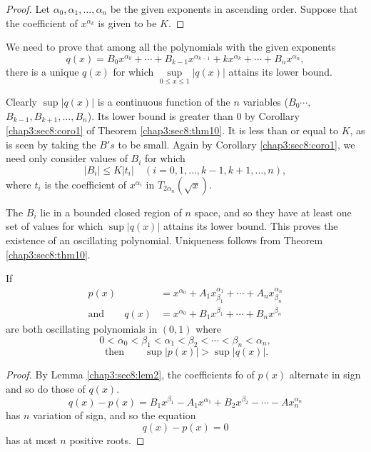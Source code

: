 \begin{proof}
  Let $\alpha _ 0, \alpha_1, \ldots, \alpha _n$ be the given exponents
  in ascending order. Suppose that the coefficient of $x^{\alpha_k}$
  is given to be $K$. 
\end{proof}

We need to prove that among all the polynomials with the given exponents
$$
q(x)=B_ 0 x^{\alpha _ 0}+ \cdots + B_{k-1}x^{\alpha_{k-1}}+k
x^{\alpha_k}+ \cdots + B_n x^{\alpha_n}, 
$$
there is a unique $q(x)$ for which $\sup \limits _{0 \leq x \leq 1}
|q(x)|$ attains its lower bound. 

Clearly $\sup |q(x)|$ is a continuous function of the $n$ variables
($B_ 0 \cdots,$ $B_{k-1},B_{k+1},\ldots, B_n$). Its lower bound is
greater than $0$ by Corollary \ref{chap3:sec8:coro1} of
Theorem \ref{chap3:sec8:thm10}. It is less than or
equal to $K$, as is seen by taking the $B's$ to be small. Again by
Corollary \ref{chap3:sec8:coro1}, we need only consider values of $B_i$ for which 
$$
|B_i|\leq K|t_i|\quad (i=0,1, \ldots, k-1,k+1,\ldots, n),
$$
where $t_i$ is the coefficient of $x^{\alpha_i}$ in $T_{2 \alpha_n}(\sqrt{x})$. 

The $B_i$ lie in a bounded closed region of $n$ space, and so they
have at least one set of values for which $\sup |q(x)|$ attains its
lower bound. This proves the existence of an oscillating
polynomial. Uniqueness follows from Theorem \ref{chap3:sec8:thm10}. 

\begin{theorem}\label{chap3:sec8:thm12}%
   If
   \begin{align*}
     p(x) & = x^{\alpha _ 0}+A_1x^{\alpha_1}_{\beta_1}+ \cdots +A_n
     x^{\alpha _n}_{\beta _n}\\ 
     \text{and}\qquad q(x)&= x^{\alpha_0}+B_1
     x^{\beta_1}+\cdots +B_n x^{\beta_n}
   \end{align*}
   are both oscillating polynomials in $(0,1)$ where
   $$
   0<\alpha_0<\beta_1< \alpha_1 < \beta_2 < \cdots <\beta_n <\alpha_n,
   $$
   $$
   ~\text{then} \qquad \sup|p(x)|>\sup|q(x)|.
   $$
\end{theorem}

\begin{proof}
  By Lemma \ref{chap3:sec8:lem2}, the coefficients fo  of $p(x)$ alternate in sign and
  so do those of $q(x)$.  
  $$
  q(x)-p(x)=B_1x^{\beta_1}-A_1x^{\alpha_1}+B_2 x^{\beta_2}-\cdots -A x_n^{\alpha_n}
  $$
  has $n$ variation of sign, and so the equation
  $$
  q(x)-p(x)=0
  $$
  has at most $n$ positive roots.
\end{proof}

